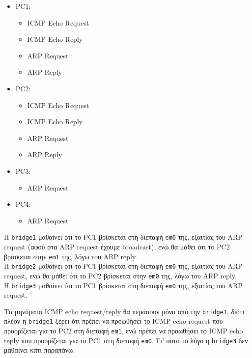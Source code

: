 \documentclass[a4paper, 12pt]{article}
\begin{document}
		\begin{itemize}
			\item PC1: 
				\begin{itemize}
					\item ICMP Echo Request
					\item ICMP Echo Reply
					\item ARP Request
					\item ARP Reply
				\end{itemize}
			\item PC2: 
				\begin{itemize}
					\item ICMP Echo Request
					\item ICMP Echo Reply
					\item ARP Request
					\item ARP Reply
				\end{itemize}
			\item PC3: 
				\begin{itemize}
					\item ARP Request
				\end{itemize}
			\item PC4: 
				\begin{itemize}
					\item ARP Request
				\end{itemize}
		\end{itemize}
		
		Η \verb|bridge1| μαθαίνει ότι το PC1 βρίσκεται στη διεπαφή \verb|em0| της, εξαιτίας του ARP request (αφού στα ARP request έχουμε broadcast), ενώ θα μάθει ότι το PC2 βρίσκεται στην \verb|em1| της, λόγω του ARP reply. \\
		
		H \verb|bridge2| μαθαίνει ότι το PC1 βρίσκεται στη διεπαφή \verb|em0| της, εξαιτίας του ARP request, ενώ θα μάθει ότι το PC2 βρίσκεται στην \verb|em0| της, λόγω του ARP reply. \\
		
		Η \verb|bridge3| μαθαίνει ότι το PC1 βρίσκεται στη διεπαφή \verb|em0| της, εξαιτίας του ARP request.
		
		Τα μηνύματα ICMP echo request/reply θα περάσουν μόνο από την \verb|bridge1|, διότι πλέον η \verb|bridge1| ξέρει ότι πρέπει να προωθήσει το ICMP echo request που προορίζεται για το PC2 στη διεπαφή \verb|em1|, ενώ πρέπει να προωθήσει το ICMP echo reply που προορίζεται για το PC1 στη διεπαφή \verb|em0|. Γι' αυτό το λόγο η \verb|bridge3| δεν μαθαίνει κάτι παραπάνω.
\end{document}

